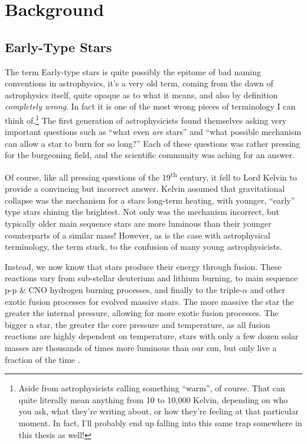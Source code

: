 \chapter{Background}

\section{Early-Type Stars}
\label{sec:earlytype}

The term Early-type stars is quite possibly the epitome of bad naming conventions in astrophysics, it's a very old term, coming from the dawn of astrophysics itself, quite opaque as to what it means, and also by definition \textit{completely wrong}. In fact it is one of the most wrong pieces of terminology I can think of.\footnote{Aside from astrophysicists calling something ``warm'', of course. That can quite literally mean anything from 10 to 10,000 Kelvin, depending on who you ask, what they're writing about, or how they're feeling at that particular moment. In fact, I'll probably end up falling into this same trap somewhere in this thesis as well!}
The first generation of astrophysicists found themselves asking very important questions such as ``what even \textit{are} stars'' and ``what possible mechanism can allow a star to burn for so long?'' Each of these questions was rather pressing for the burgeoning field, and the scientific community was aching for an answer.

Of course, like all pressing questions of the 19\textsuperscript{th} century, it fell to Lord Kelvin to provide a convincing but incorrect answer. Kelvin assumed that gravitational collapse was the mechanism for a stars long-term heating, with younger, ``early'' type stars shining the brightest. Not only was the mechanism incorrect, but typically older main sequence stars are more luminous than their younger counterparts of a similar mass! However, as is the case with astrophysical terminology, the term stuck, to the confusion of many young astrophysicists.


Instead, we now know that stars produce their energy through fusion. These reactions vary from sub-stellar deuterium and lithium burning, to main sequence p-p \& CNO hydrogen burning processes, and finally to the triple-$\alpha$ and other exotic fusion processes for evolved massive stars. The more massive the star the greater the internal pressure, allowing for more exotic fusion processes.
The bigger a star, the greater the core pressure and temperature, as all fusion reactions are highly dependent on temperature, stars with only a few dozen solar masses are thousands of times more luminous than our sun, but only live a fraction of the time \parencite{carrollIntroductionModernAstrophysics2014}.

